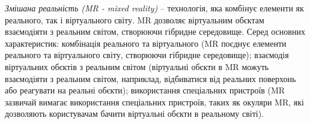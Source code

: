 \emph{Змішана реальність (MR - mixed reality)} -- технологія, яка комбінує елементи як реального, так і віртуального світу. MR дозволяє віртуальним об\textquotesingle єктам взаємодіяти з реальним світом, створюючи гібридне середовище. Серед основних характеристик: комбінація реального та віртуального (MR поєднує елементи реального та віртуального світу, створюючи гібридне середовище); взаємодія віртуальних об\textquotesingle єктів з реальним світом (віртуальні об\textquotesingle єкти в MR можуть взаємодіяти з реальним світом, наприклад, відбиватися від реальних поверхонь або реагувати на реальні об\textquotesingle єкти); використання спеціальних пристроїв (MR зазвичай вимагає використання спеціальних пристроїв, таких як окуляри MR, які дозволяють користувачам бачити віртуальні об\textquotesingle єкти в реальному світі).

